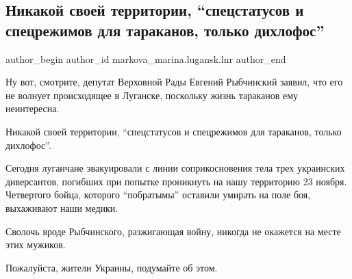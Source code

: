  
 
 
 
 
 
\subsection{Никакой своей территории, \enquote{спецстатусов и спецрежимов для тараканов, только дихлофос}}
\label{sec:25_11_2017.fb.markova_marina.lugansk.lnr.1.rybchinskij_donbass}
 
\ifcmt
 author_begin
   author_id markova_marina.lugansk.lnr
 author_end
\fi

Ну вот, смотрите, депутат Верховной Рады Евгений Рыбчинский заявил, что его не
волнует происходящее в Луганске, поскольку жизнь тараканов ему неинтересна. 

Никакой своей территории, \enquote{спецстатусов и спецрежимов для тараканов, только
дихлофос}. 

Сегодня луганчане эвакуировали с линии соприкосновения тела трех украинских
диверсантов, погибших при попытке проникнуть на нашу территорию 23 ноября.
Четвертого бойца, которого \enquote{побратымы} оставили умирать на поле боя, выхаживают
наши медики.

Сволочь вроде Рыбчинского, разжигающая войну, никогда не окажется на месте этих
мужиков. 

Пожалуйста, жители Украины, подумайте об этом.


